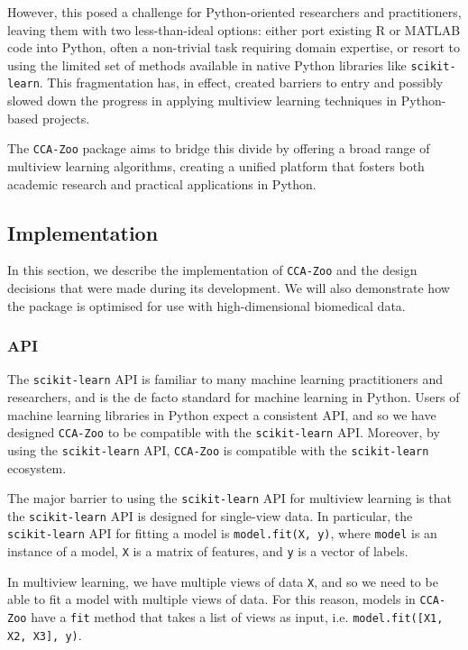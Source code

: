 However, this posed a challenge for Python-oriented researchers and practitioners, leaving them with two less-than-ideal options: either port existing R or MATLAB code into Python, often a non-trivial task requiring domain expertise, or resort to using the limited set of methods available in native Python libraries like \texttt{scikit-learn}.
This fragmentation has, in effect, created barriers to entry and possibly slowed down the progress in applying multiview learning techniques in Python-based projects.

The \texttt{CCA-Zoo} package aims to bridge this divide by offering a broad range of multiview learning algorithms, creating a unified platform that fosters both academic research and practical applications in Python.

\subsection{Implementation}

In this section, we describe the implementation of \texttt{CCA-Zoo} and the design decisions that were made during its development.
We will also demonstrate how the package is optimised for use with high-dimensional biomedical data.

\subsubsection{API}

The \texttt{scikit-learn} API is familiar to many machine learning practitioners and researchers, and is the de facto standard for machine learning in Python.
Users of machine learning libraries in Python expect a consistent API, and so we have designed \texttt{CCA-Zoo} to be compatible with the \texttt{scikit-learn} API.
Moreover, by using the \texttt{scikit-learn} API, \texttt{CCA-Zoo} is compatible with the \texttt{scikit-learn} ecosystem.

The major barrier to using the \texttt{scikit-learn} API for multiview learning is that the \texttt{scikit-learn} API is designed for single-view data.
In particular, the \texttt{scikit-learn} API for fitting a model is \texttt{model.fit(X, y)}, where \texttt{model} is an instance of a model, \texttt{X} is a matrix of features, and \texttt{y} is a vector of labels.

In multiview learning, we have multiple views of data \texttt{X}, and so we need to be able to fit a model with multiple views of data.
For this reason, models in \texttt{CCA-Zoo} have a \texttt{fit} method that takes a list of views as input, i.e. \texttt{model.fit([X1, X2, X3], y)}.

